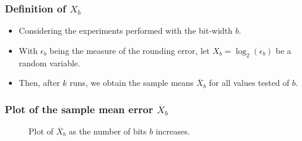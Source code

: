 \documentclass[serif, 12pt]{beamer}
\begin{document}
\begin{frame}
\frametitle{Definition of $X_b$}
\begin{itemize}
\item Considering the experiments performed with the bit-width $b$.

\item With $\epsilon_b$ being the measure of the rounding error, let $X_b = 
\log_2(\epsilon_b)$ be a random variable.

\item Then, after $k$ runs, we obtain the sample means $\overline X_b$ for all 
values tested of $b$.
\end{itemize}
\end{frame}


%


\begin{frame}

\frametitle{Plot of the sample mean error $\overline X_b$}

\begin{figure}[h]
	\caption{Plot of $\overline X_b$ as the number of bits $b$ increases.}
	\label{fig:errhh}
\end{figure}

\end{frame}

\end{document}
